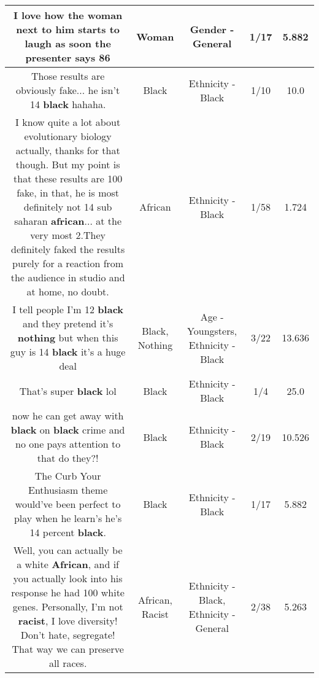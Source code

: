 \documentclass[11pt]{article}
\newlength\mylength
\begin{document}
\begin{center}
\begin{longtable}{|C{.65\mylength}|C{.30\mylength}|C{.12\mylength}|C{.12\mylength}|C{.12\mylength}|}
  \small I love how the \textbf{woman} next to him starts to laugh as soon the presenter says 86\normalsize   & Woman & Gender - General & 1/17 & 5.882 \\  \hline
  \small Those results are obviously fake... he isn't 14 \textbf{black} hahaha.\normalsize   & Black & Ethnicity - Black & 1/10 & 10.0 \\  \hline
  \small I know quite a lot about evolutionary biology actually, thanks for that though. But my point is that these results are 100 fake, in that, he is most definitely not 14 sub saharan \textbf{african}... at the very most 2.They definitely faked the results purely for a reaction from the audience in studio and at home, no doubt.\normalsize   & African & Ethnicity - Black & 1/58 & 1.724 \\  \hline
  \small I tell people I'm 12 \textbf{black} and they pretend it's \textbf{nothing} but when this guy is 14 \textbf{black} it's a huge deal\normalsize   & Black, Nothing & Age - Youngsters, Ethnicity - Black & 3/22 & 13.636 \\  \hline
  \small That's super \textbf{black} lol\normalsize   & Black & Ethnicity - Black & 1/4 & 25.0 \\  \hline
  \small now he can get away with \textbf{black} on \textbf{black} crime and no one pays attention to that do they?!\normalsize   & Black & Ethnicity - Black & 2/19 & 10.526 \\  \hline
  \small The Curb Your Enthusiasm theme would've been perfect to play when he learn's he's 14 percent \textbf{black}.\normalsize   & Black & Ethnicity - Black & 1/17 & 5.882 \\  \hline
  \small Well, you can actually be a white \textbf{African}, and if you actually look into his response he had 100 white genes. Personally, I'm not \textbf{racist}, I love diversity! Don't hate, segregate! That way we can preserve all races.\normalsize   & African, Racist & Ethnicity - Black, Ethnicity - General & 2/38 & 5.263 \\  \hline

\end{longtable}
\end{center}
\end{document}
